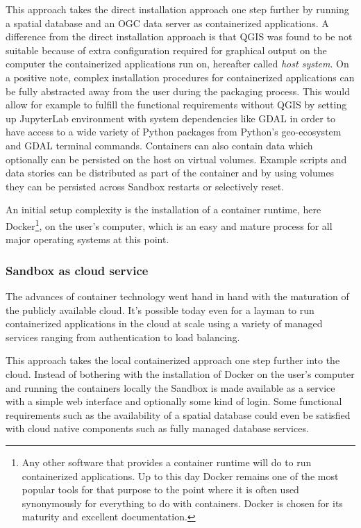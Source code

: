 \documentclass[11pt, a4paper, oneside, parskip=full-]{scrartcl}
\begin{document}
This approach takes the direct installation approach one step further by running
a spatial database and an OGC data server as containerized applications. A
difference from the direct installation approach is that QGIS was found to be
not suitable because of extra configuration required for graphical output on the
computer the containerized applications run on, hereafter called \emph{host
system}. On a positive note, complex installation procedures for containerized
applications can be fully abstracted away from the user during the packaging
process. This would allow for example to fulfill the functional requirements
without QGIS by setting up JupyterLab environment with system dependencies like
GDAL in order to have access to a wide variety of Python packages from Python's
geo-ecosystem and GDAL terminal commands. Containers can also contain data which
optionally can be persisted on the host on virtual volumes. Example scripts and
data stories can be distributed as part of the container and by using volumes
they can be persisted across Sandbox restarts or selectively reset.

An initial setup complexity is the installation of a container runtime, here
Docker\footnote{Any other software that provides a container runtime will do to
run containerized applications. Up to this day Docker remains one of the most
popular tools for that purpose to the point where it is often used synonymously
for everything to do with containers. Docker is chosen for its maturity and
excellent documentation.}, on the user's computer, which is an easy and mature
process for all major operating systems at this point.

\subsubsection*{Sandbox as cloud service}
The advances of container technology went hand in hand with the maturation of
the publicly available cloud. It's possible today even for a layman to run
containerized applications in the cloud at scale using a variety of managed
services ranging from authentication to load balancing.

This approach takes the local containerized approach one step further into the
cloud. Instead of bothering with the installation of Docker on the user's
computer and running the containers locally the Sandbox is made available as a
service with a simple web interface and optionally some kind of login. Some
functional requirements such as the availability of a spatial database could
even be satisfied with cloud native components such as fully managed database
services.
\end{document}
